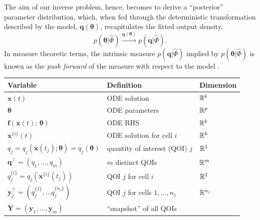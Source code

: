 The aim of our inverse problem, hence, becomes to derive a ``posterior'' parameter distribution, which, when fed through the deterministic transformation described by the model, $\boldsymbol{q}(\boldsymbol{\theta})$, recapitulates the fitted output density,
%
\begin{equation}
p(\boldsymbol{\theta}|\hat{\Phi}) \xrightarrow{\boldsymbol{q}(\boldsymbol{\theta})} p(\boldsymbol{q}|\hat{\Phi}).
\end{equation}
%
In measure theoretic terms, the intrinsic measure $p(\boldsymbol{q}|\hat{\Phi})$ implied by $p(\boldsymbol{\theta}|\hat{\Phi})$ is known as the \textit{push forward} of the measure with respect to the model \cite{BJW-18}.


\begin{table}[htbp]
\centering
\begin{adjustwidth}{-0.6in}{0in}%
\begin{tabularx}{1.2\textwidth}{lll}
Variable	                                                & Definition                                   & Dimension \\
\toprule
$\boldsymbol{x}(t)$                                     	& ODE solution                                 & $\mathbb{R}^k$ \\
$\boldsymbol{\theta}$                                     	& ODE parameters                               & $\mathbb{R}^p$ \\
$\boldsymbol{f}(\boldsymbol{x}(t); \, \boldsymbol{\theta})$	& ODE RHS                                      & $\mathbb{R}^k$ \\
$\boldsymbol{x}^{\{i\}}(t)$                                 & ODE solution for cell $i$                    & $\mathbb{R}^k$ \\
$q_j= q_j(\boldsymbol{x}(t_j);\boldsymbol{\theta}) = q_j(\boldsymbol{\theta})$                             & quantity of interest (QOI) $j$               & $\mathbb{R}^1$ \\
$\boldsymbol{q}^\top= \left( q_1, \dots, q_m \right)$       & $m$ distinct QOIs                            & $\mathbb{R}^m$ \\
$q_j^{\{i\}}= q_j(\boldsymbol{x}^{\{i\}}(t_j))$             & QOI $j$ for cell $i$                         & $\mathbb{R}^1$ \\
$\boldsymbol{y}_j^\top=\left( q_j^{\{1\}}, \dots q_j^{\{n_j\}} \right)$  & QOI $j$ for cells $1, \dots, n_j$    & $\mathbb{R}^{n_j}$ \\
$\boldsymbol{Y}=(\boldsymbol{y}_1,...,\boldsymbol{y}_m)$    & ``snapshot'' of all QOIs   & \\

\end{tabularx}
\end{adjustwidth}
\end{table}
